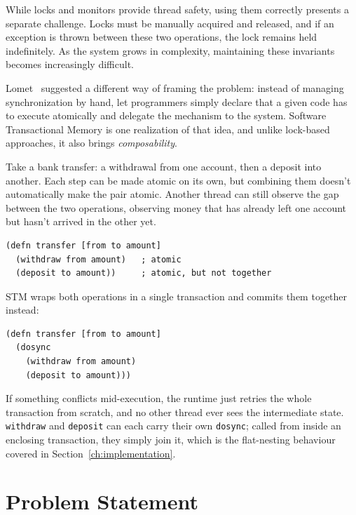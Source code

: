 While locks and monitors provide thread safety, using them correctly
presents a separate challenge. Locks must be manually acquired and
released, and if an exception is thrown between these two operations,
the lock remains held indefinitely. As the system grows in complexity,
maintaining these invariants becomes increasingly difficult.

Lomet~\cite{lomet1977} suggested a different way of framing the problem:
instead of managing synchronization by hand, let programmers simply declare
that a given code has to execute atomically and delegate the mechanism to the system.
Software Transactional Memory is one realization of that idea, and unlike lock-based
approaches, it also brings \emph{composability}.

Take a bank transfer: a withdrawal from one account, then a deposit
into another. Each step can be made atomic on its own, but combining them
doesn't automatically make the pair atomic. Another thread can
still observe the gap between the two operations, observing money that has
already left one account but hasn't arrived in the other yet.

\begin{listing}[ht]
  \begin{verbatim}
(defn transfer [from to amount]
  (withdraw from amount)   ; atomic
  (deposit to amount))     ; atomic, but not together
\end{verbatim}
  \caption{Non-composable transfer}
\end{listing}

STM wraps both operations in a single transaction and commits them together
instead:

\begin{listing}[ht]
  \begin{verbatim}
(defn transfer [from to amount]
  (dosync
    (withdraw from amount)
    (deposit to amount)))
\end{verbatim}
  \caption{Composable transfer with STM}
\end{listing}

\noindent If something conflicts mid-execution, the runtime just retries the
whole transaction from scratch, and no other thread ever sees the
intermediate state. \texttt{withdraw} and \texttt{deposit} can each carry
their own \texttt{dosync}; called from inside an enclosing transaction, they
simply join it, which is the flat-nesting behaviour covered in
Section~\ref{ch:implementation}.

\section{Problem Statement}

